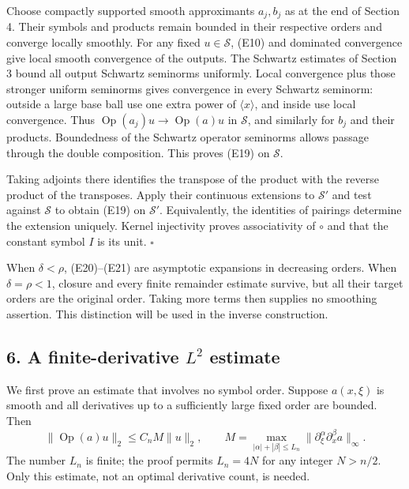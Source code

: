 \documentclass[
  11pt,
]{article}
\begin{document}
Choose compactly supported smooth approximants \(a_j,b_j\) as at the end
of Section 4. Their symbols and products remain bounded in their
respective orders and converge locally smoothly. For any fixed
\(u\in\mathcal S\), (E10) and dominated convergence give local smooth
convergence of the outputs. The Schwartz estimates of Section 3 bound
all output Schwartz seminorms uniformly. Local convergence plus those
stronger uniform seminorms gives convergence in every Schwartz seminorm:
outside a large base ball use one extra power of \(\langle x\rangle\),
and inside use local convergence. Thus
\(\operatorname{Op}(a_j)u\to\operatorname{Op}(a)u\) in \(\mathcal S\),
and similarly for \(b_j\) and their products. Boundedness of the
Schwartz operator seminorms allows passage through the double
composition. This proves (E19) on \(\mathcal S\).

Taking adjoints there identifies the transpose of the product with the
reverse product of the transposes. Apply their continuous extensions to
\(\mathcal S'\) and test against \(\mathcal S\) to obtain (E19) on
\(\mathcal S'\). Equivalently, the identities of pairings determine the
extension uniquely. Kernel injectivity proves associativity of \(\circ\)
and that the constant symbol \(I\) is its unit. \(\square\)

When \(\delta<\rho\), (E20)--(E21) are asymptotic expansions in
decreasing orders. When \(\delta=\rho<1\), closure and every finite
remainder estimate survive, but all their target orders are the original
order. Taking more terms then supplies no smoothing assertion. This
distinction will be used in the inverse construction.

\subsection{\texorpdfstring{6. A finite-derivative \(L^2\)
estimate}{6. A finite-derivative L\^{}2 estimate}}\label{a-finite-derivative-l2-estimate}

We first prove an estimate that involves no symbol order. Suppose
\(a(x,\xi)\) is smooth and all derivatives up to a sufficiently large
fixed order are bounded. Then \[
\|\operatorname{Op}(a)u\|_2\leq C_n M\|u\|_2,
\qquad
M=\max_{|\alpha|+|\beta|\leq L_n}
\|\partial_\xi^\alpha\partial_x^\beta a\|_\infty.
\tag{E23}
\] The number \(L_n\) is finite; the proof permits \(L_n=4N\) for any
integer \(N>n/2\). Only this estimate, not an optimal derivative count,
is needed.
\end{document}

